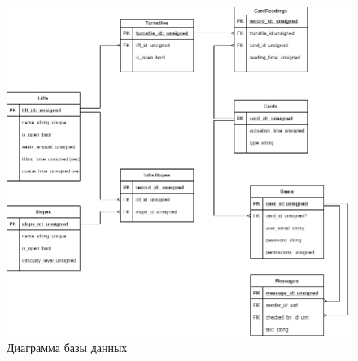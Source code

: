 \begin{figure}[h!]
	\begin{center}
		\includegraphics[scale=0.4]{../imgs/db/db.png}
	\end{center}
	\captionsetup{justification=centering}
	\caption{Диаграмма базы данных}
	\label{img:db}
\end{figure}
































